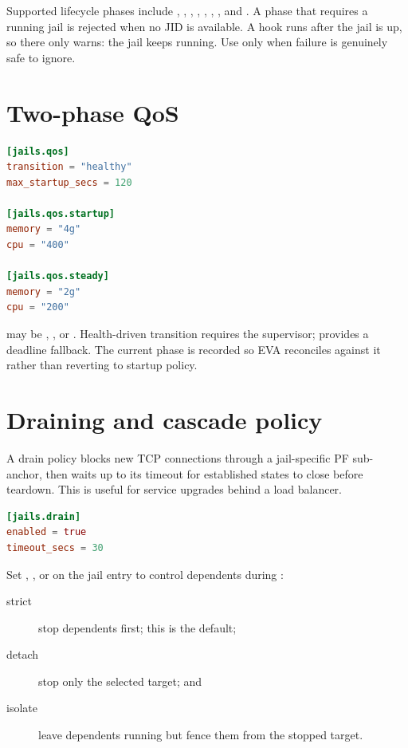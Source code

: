 Supported lifecycle phases include ,
, , ,
, , , and
. A phase that requires a running jail is rejected when no
JID is available. A  hook runs after the jail is up, so
 there only warns: the jail keeps running. Use
 only when failure is genuinely safe to ignore.

\section{Two-phase QoS}

\begin{lstlisting}[language=TOML]
[jails.qos]
transition = "healthy"
max_startup_secs = 120

[jails.qos.startup]
memory = "4g"
cpu = "400"

[jails.qos.steady]
memory = "2g"
cpu = "200"
\end{lstlisting}

 may be , , or
. Health-driven transition requires the supervisor;
 provides a deadline fallback. The current phase is
recorded so EVA reconciles against it rather than reverting to startup policy.

\section{Draining and cascade policy}

A drain policy blocks new TCP connections through a jail-specific PF
sub-anchor, then waits up to its timeout for established states to close before
teardown. This is useful for service upgrades behind a load balancer.

\begin{lstlisting}[language=TOML]
[jails.drain]
enabled = true
timeout_secs = 30
\end{lstlisting}

Set , , or
 on the jail entry to control dependents during
:

\begin{description}
  \item[strict] stop dependents first; this is the default;
  \item[detach] stop only the selected target; and
  \item[isolate] leave dependents running but fence them from the stopped target.
\end{description}

